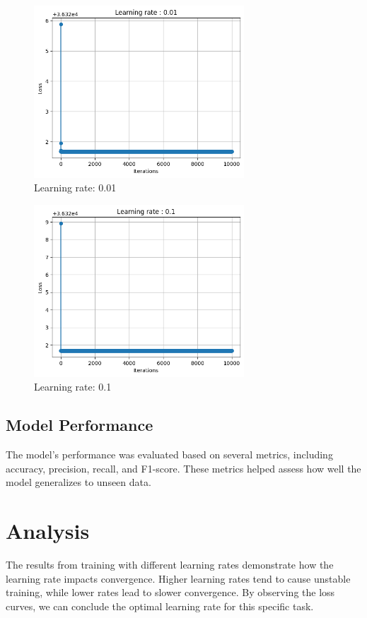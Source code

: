 \documentclass[12pt]{article}
\begin{document}
\begin{figure}[h!]
    \centering
    \includegraphics[width=0.7\textwidth]{plot_32.png}
    \caption{Learning rate: 0.01}
    \label{fig:lr0.01}
\end{figure}

\begin{figure}[h!]
    \centering
    \includegraphics[width=0.7\textwidth]{plot_33.png}
    \caption{Learning rate: 0.1}
    \label{fig:lr0.1}
\end{figure}

\subsection{Model Performance}
The model's performance was evaluated based on several metrics, including accuracy, precision, recall, and F1-score. These metrics helped assess how well the model generalizes to unseen data.

\section{Analysis}
The results from training with different learning rates demonstrate how the learning rate impacts convergence. Higher learning rates tend to cause unstable training, while lower rates lead to slower convergence. By observing the loss curves, we can conclude the optimal learning rate for this specific task.
\end{document}
